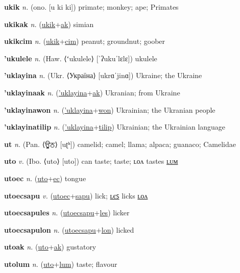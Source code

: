 \textbf{\hypertarget{ukik}{ukik}} \textit{n.} (ono. [u ki ki])
primate; monkey; ape; Primates

\textbf{\hypertarget{ukikak}{ukikak}} \textit{n.} (\hyperlink{ukik}{ukik}+\allowbreak \hyperlink{ak}{ak})
simian

\textbf{\hypertarget{ukikcim}{ukikcim}} \textit{n.} (\hyperlink{ukik}{ukik}+\allowbreak \hyperlink{cim}{cim})
peanut; groundnut; goober

\textbf{\hypertarget{'ukulele}{'ukulele}} \textit{n.} (Haw. ⟨ʻukulele⟩ [ˈʔukuˈlɛlɛ])
ukulele

\textbf{\hypertarget{'uklayina}{'uklayina}} \textit{n.} (Ukr. ⟨Україна⟩ [ukrɑˈjinɑ])
Ukraine; the Ukraine

\textbf{\hypertarget{'uklayinaak}{'uklayinaak}} \textit{n.} (\hyperlink{'uklayina}{'uklayina}+\allowbreak \hyperlink{ak}{ak})
Ukranian; from Ukraine

\textbf{\hypertarget{'uklayinawon}{'uklayinawon}} \textit{n.} (\hyperlink{'uklayina}{'uklayina}+\allowbreak \hyperlink{won}{won})
Ukrainian; the Ukranian people

\textbf{\hypertarget{'uklayinatilip}{'uklayinatilip}} \textit{n.} (\hyperlink{'uklayina}{'uklayina}+\allowbreak \hyperlink{tilip}{tilip})
Ukrainian; the Ukrainian language

\textbf{\hypertarget{ut}{ut}} \textit{n.} (Pan. ⟨{\gurmukhi{}ਊਠ}⟩ [uʈʰ])
camelid; camel; llama; alpaca; guanaco; Camelidae

\textbf{\hypertarget{uto}{uto}} \textit{v.} (Ibo. ⟨uto⟩ [uto])
can taste; taste; ʟᴏᴧ tastes \hyperlink{utolum}{ʟᴜᴍ}

\textbf{\hypertarget{utoec}{utoec}} \textit{n.} (\hyperlink{uto}{uto}+\allowbreak \hyperlink{ec}{ec})
tongue

\textbf{\hypertarget{utoecsapu}{utoecsapu}} \textit{v.} (\hyperlink{utoec}{utoec}+\allowbreak \hyperlink{sapu}{sapu})
lick; \hyperlink{utoecsapules}{ʟєꜱ} licks \hyperlink{utoecsapulon}{ʟᴏᴧ}

\textbf{\hypertarget{utoecsapules}{utoecsapules}} \textit{n.} (\hyperlink{utoecsapu}{utoecsapu}+\allowbreak \hyperlink{les}{les})
licker

\textbf{\hypertarget{utoecsapulon}{utoecsapulon}} \textit{n.} (\hyperlink{utoecsapu}{utoecsapu}+\allowbreak \hyperlink{lon}{lon})
licked

\textbf{\hypertarget{utoak}{utoak}} \textit{n.} (\hyperlink{uto}{uto}+\allowbreak \hyperlink{ak}{ak})
gustatory

\textbf{\hypertarget{utolum}{utolum}} \textit{n.} (\hyperlink{uto}{uto}+\allowbreak \hyperlink{lum}{lum})
taste; flavour

